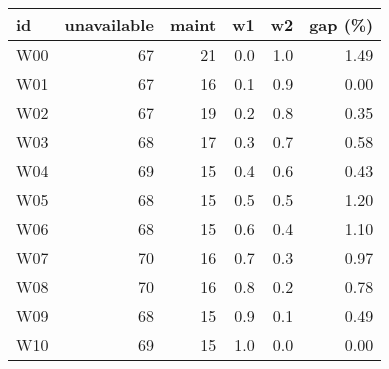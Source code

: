 \begin{tabular}{lrrrrr}
\toprule
  id &  unavailable &  maint &   w1 &   w2 &  gap (\%) \\
\midrule
 W00 &           67 &     21 &  0.0 &  1.0 &     1.49 \\
 W01 &           67 &     16 &  0.1 &  0.9 &     0.00 \\
 W02 &           67 &     19 &  0.2 &  0.8 &     0.35 \\
 W03 &           68 &     17 &  0.3 &  0.7 &     0.58 \\
 W04 &           69 &     15 &  0.4 &  0.6 &     0.43 \\
 W05 &           68 &     15 &  0.5 &  0.5 &     1.20 \\
 W06 &           68 &     15 &  0.6 &  0.4 &     1.10 \\
 W07 &           70 &     16 &  0.7 &  0.3 &     0.97 \\
 W08 &           70 &     16 &  0.8 &  0.2 &     0.78 \\
 W09 &           68 &     15 &  0.9 &  0.1 &     0.49 \\
 W10 &           69 &     15 &  1.0 &  0.0 &     0.00 \\
\bottomrule
\end{tabular}
